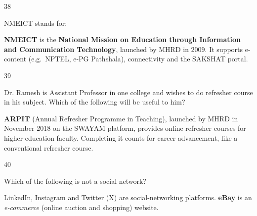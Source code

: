 \begin{question}{38}
{NMEICT stands for:\par}
\begin{explain}
\textbf{NMEICT} is the \textbf{National Mission on Education through Information and Communication Technology}, launched by MHRD in 2009. It supports e-content (e.g.\ NPTEL, e-PG Pathshala), connectivity and the SAKSHAT portal.
\end{explain}
\end{question}

\begin{question}{39}
{Dr. Ramesh is Assistant Professor in one college and wishes to do refresher course in his subject. Which of the following will be useful to him?\par}
\begin{explain}
\textbf{ARPIT} (Annual Refresher Programme in Teaching), launched by MHRD in November 2018 on the SWAYAM platform, provides online refresher courses for higher-education faculty. Completing it counts for career advancement, like a conventional refresher course.
\end{explain}
\end{question}

\begin{question}{40}
{Which of the following is not a social network?\par}
\begin{explain}
LinkedIn, Instagram and Twitter (X) are social-networking platforms. \textbf{eBay} is an \emph{e-commerce} (online auction and shopping) website.
\end{explain}
\end{question}

